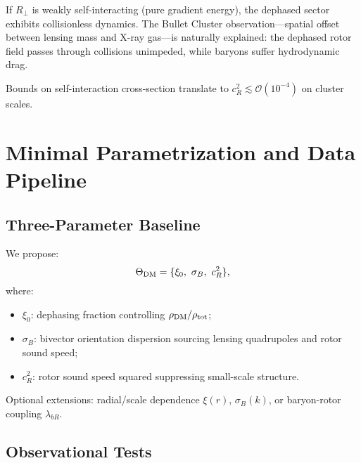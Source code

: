 \documentclass[11pt,a4paper]{article}
\numberwithin{equation}{section}
\theoremstyle{plain}
\theoremstyle{definition}
\theoremstyle{remark}
\begin{document}
If $R_\perp$ is weakly self-interacting (pure gradient energy), the dephased sector exhibits collisionless dynamics. The Bullet Cluster observation---spatial offset between lensing mass and X-ray gas---is naturally explained: the dephased rotor field passes through collisions unimpeded, while baryons suffer hydrodynamic drag.

Bounds on self-interaction cross-section translate to $c_R^2\lesssim \mathcal{O}(10^{-4})$ on cluster scales.

\vspace{1em}

\section{Minimal Parametrization and Data Pipeline}\label{sec:pipeline}

\subsection{Three-Parameter Baseline}

We propose:
\begin{equation}
\Theta_{\rm DM}=\{\xi_0,\ \sigma_B,\ c_R^2\},
\label{eq:params}
\end{equation}
where:
\begin{itemize}[leftmargin=*]
  \item $\xi_0$: dephasing fraction controlling $\rho_{\rm DM}/\rho_{\rm tot}$;
  \item $\sigma_B$: bivector orientation dispersion sourcing lensing quadrupoles and rotor sound speed;
  \item $c_R^2$: rotor sound speed squared suppressing small-scale structure.
\end{itemize}

Optional extensions: radial/scale dependence $\xi(r)$, $\sigma_B(k)$, or baryon-rotor coupling $\lambda_{bR}$.

\subsection{Observational Tests}
\end{document}
